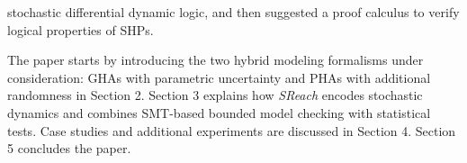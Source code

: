 stochastic differential dynamic logic, and then suggested a proof calculus to verify logical properties of SHPs. 

The paper starts by introducing the two hybrid modeling formalisms under consideration: GHAs with parametric uncertainty and PHAs with additional randomness in Section 2. Section 3 explains how {\it SReach} encodes stochastic dynamics and combines SMT-based bounded model checking with statistical tests. Case studies and additional experiments are discussed in Section 4. Section 5 concludes the paper.
